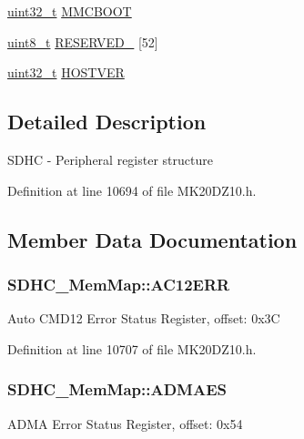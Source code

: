 \begin{DoxyCompactItemize}
\item 
\hyperlink{_p_e___types_8h_a33594304e786b158f3fb30289278f5af}{uint32\+\_\+t} \hyperlink{struct_s_d_h_c___mem_map_a624306ff04a5ff80059afce5d4e8cf3e}{M\+M\+C\+B\+O\+OT}
\item 
\hyperlink{_p_e___types_8h_aba7bc1797add20fe3efdf37ced1182c5}{uint8\+\_\+t} \hyperlink{struct_s_d_h_c___mem_map_ad593c098233cbb60497a364b88d113b8}{R\+E\+S\+E\+R\+V\+E\+D\+\_} \mbox{[}52\mbox{]}
\item 
\hyperlink{_p_e___types_8h_a33594304e786b158f3fb30289278f5af}{uint32\+\_\+t} \hyperlink{struct_s_d_h_c___mem_map_a27ec00dc3be305a561fae9978fe799a2}{H\+O\+S\+T\+V\+ER}
\end{DoxyCompactItemize}


\subsection{Detailed Description}
S\+D\+HC -\/ Peripheral register structure 

Definition at line 10694 of file M\+K20\+D\+Z10.\+h.



\subsection{Member Data Documentation}
\subsubsection[{\texorpdfstring{A\+C12\+E\+RR}{AC12ERR}}]{ S\+D\+H\+C\+\_\+\+Mem\+Map\+::\+A\+C12\+E\+RR}\hypertarget{struct_s_d_h_c___mem_map_a3d4ff140cfa30e28f82a66490103dc18}{}\label{struct_s_d_h_c___mem_map_a3d4ff140cfa30e28f82a66490103dc18}
Auto C\+M\+D12 Error Status Register, offset\+: 0x3C 

Definition at line 10707 of file M\+K20\+D\+Z10.\+h.

\subsubsection[{\texorpdfstring{A\+D\+M\+A\+ES}{ADMAES}}]{ S\+D\+H\+C\+\_\+\+Mem\+Map\+::\+A\+D\+M\+A\+ES}\hypertarget{struct_s_d_h_c___mem_map_a23a2344d2bcccb1d642214ffa2d011cc}{}\label{struct_s_d_h_c___mem_map_a23a2344d2bcccb1d642214ffa2d011cc}
A\+D\+MA Error Status Register, offset\+: 0x54 

